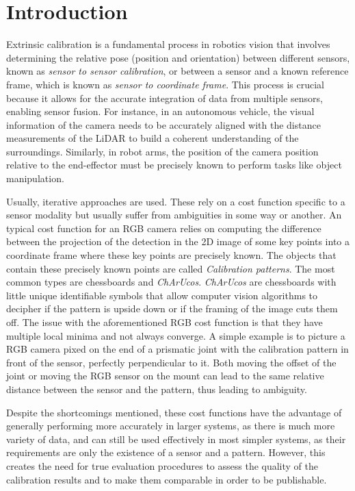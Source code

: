 \section{Introduction}
\label{sec:introduction}

Extrinsic calibration is a fundamental process in robotics vision that involves determining the
relative pose (position and orientation) between different sensors, known as \textit{sensor to sensor calibration}, or between a sensor and a known reference
frame, which is known as \textit{sensor to coordinate frame}. This process is crucial because it allows for the accurate integration of data from multiple sensors,
enabling sensor fusion. For instance, in an autonomous vehicle, the visual information of the camera
needs to be accurately aligned with the distance measurements of the LiDAR to build a coherent understanding of the
surroundings. Similarly, in robot arms, the position of the camera position relative to the end-effector must be precisely
known to perform tasks like object manipulation. 

Usually, iterative approaches are used. These rely on a cost function specific to a sensor modality but usually suffer from ambiguities
in some way or another. An typical cost function for an RGB camera relies on computing the difference between the projection of the
detection in the 2D image of some key points into a coordinate frame where these key points are precisely known. The objects that
contain these precisely known points are called \textit{Calibration patterns}. The most common types are chessboards and \textit{ChArUcos}.
\textit{ChArUcos} are chessboards with little unique identifiable symbols that allow computer vision algorithms to decipher if the
pattern is upside down or if the framing of the image cuts them off. The issue with the aforementioned RGB cost function is that they
have multiple local minima and not always converge. A simple example is to picture a RGB camera pixed on the end of a prismatic joint
with the calibration pattern in front of the sensor, perfectly perpendicular to it. Both moving the offset of the joint or
moving the RGB sensor on the mount can lead to the same relative distance between the sensor and the pattern, thus leading to
ambiguity. 

Despite the shortcomings mentioned, these cost functions have the advantage of generally performing more accurately in larger systems,
as there is much more variety of data, and can still be used effectively in most simpler systems, as their requirements are only the
existence of a sensor and a pattern. However, this creates the need for true evaluation procedures to assess the quality of the
calibration results and to make them comparable in order to be publishable. 

